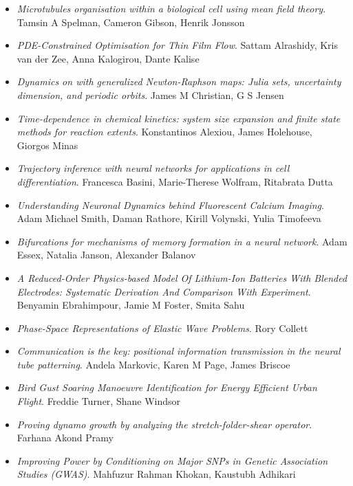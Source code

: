 \begin{itemize}
\item \textit{Microtubules organisation within a biological cell using mean field theory}.
Tamsin A Spelman, Cameron Gibson, Henrik Jonsson

\item \textit{PDE-Constrained Optimisation for Thin Film Flow}.
Sattam Alrashidy, Kris van der Zee, Anna Kalogirou, Dante Kalise

\item \textit{Dynamics on \textcent{} with generalized Newton-Raphson maps: Julia sets, uncertainty dimension, and periodic orbits}.
James M Christian, G S Jensen

\item \textit{Time-dependence in chemical kinetics: system size expansion and finite state methods for reaction extents}.
Konstantinos Alexiou, James Holehouse, Giorgos Minas

\item \textit{Trajectory inference with neural networks for applications in cell differentiation}.
Francesca Basini, Marie-Therese Wolfram, Ritabrata Dutta

\item \textit{Understanding Neuronal Dynamics behind Fluorescent Calcium Imaging}.
Adam Michael Smith, Daman Rathore, Kirill Volynski, Yulia Timofeeva

\item \textit{Bifurcations for mechanisms of memory formation in a neural network}.
Adam Essex, Natalia Janson, Alexander Balanov

\item \textit{A Reduced-Order Physics-based Model Of Lithium-Ion Batteries With Blended Electrodes: Systematic Derivation And Comparison With Experiment}.
Benyamin Ebrahimpour, Jamie M Foster, Smita Sahu

\item \textit{Phase-Space Representations of Elastic Wave Problems}.
Rory Collett

\item \textit{Communication is the key: positional information transmission in the neural tube patterning}.
Andela Markovic, Karen M Page, James Briscoe

\item \textit{Bird Gust Soaring Manoeuvre Identification for Energy Efficient Urban Flight}.
Freddie Turner, Shane Windsor

\item \textit{Proving dynamo growth by analyzing the stretch-folder-shear operator}.
Farhana Akond Pramy

\item \textit{Improving Power by Conditioning on Major SNPs in Genetic Association Studies (GWAS)}.
Mahfuzur Rahman Khokan, Kaustubh Adhikari

\end{itemize}


